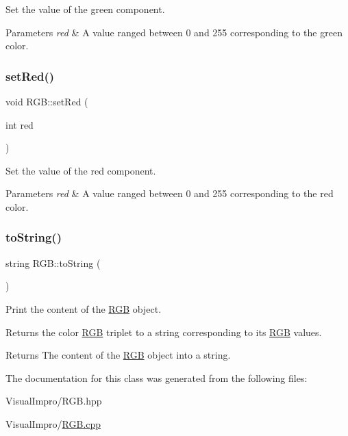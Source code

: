 Set the value of the green component. 


\begin{DoxyParams}{Parameters}
{\em red} & A value ranged between 0 and 255 corresponding to the green color. \\
\hline
\end{DoxyParams}
\mbox{\label{class_r_g_b_a6817b57299fc1ebde6c8c517791bbcd3}} 
\subsubsection{\texorpdfstring{set\+Red()}{setRed()}}
{\footnotesize\ttfamily void R\+G\+B\+::set\+Red (\begin{DoxyParamCaption}\item[{int}]{red }\end{DoxyParamCaption})}



Set the value of the red component. 


\begin{DoxyParams}{Parameters}
{\em red} & A value ranged between 0 and 255 corresponding to the red color. \\
\hline
\end{DoxyParams}
\mbox{\label{class_r_g_b_afc741ad6365b34a61bf3a4e29ea473bf}} 
\subsubsection{\texorpdfstring{to\+String()}{toString()}}
{\footnotesize\ttfamily string R\+G\+B\+::to\+String (\begin{DoxyParamCaption}{ }\end{DoxyParamCaption})}



Print the content of the \mbox{\hyperlink{class_r_g_b}{R\+GB}} object. 

Returns the color \mbox{\hyperlink{class_r_g_b}{R\+GB}} triplet to a string corresponding to its \mbox{\hyperlink{class_r_g_b}{R\+GB}} values.

\begin{DoxyReturn}{Returns}
The content of the \mbox{\hyperlink{class_r_g_b}{R\+GB}} object into a string. 
\end{DoxyReturn}


The documentation for this class was generated from the following files\+:\begin{DoxyCompactItemize}
\item 
Visual\+Impro/R\+G\+B.\+hpp\item 
Visual\+Impro/\mbox{\hyperlink{_r_g_b_8cpp}{R\+G\+B.\+cpp}}\end{DoxyCompactItemize}
